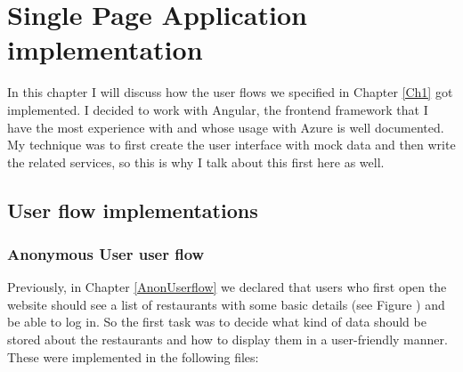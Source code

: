 \chapter{Single Page Application implementation}\label{Ch3}
 
 In this chapter I will discuss how the user flows we specified in Chapter \ref{Ch1} got implemented. I decided to work with Angular, the frontend framework that I have the most experience with and whose usage with Azure is well documented. My technique was to first create the user interface with mock data and then write the related services, so this is why I talk about this first here as well. 
 
\section{User flow implementations}
 
\subsection{Anonymous User user flow}

Previously, in Chapter \ref{AnonUserflow} we declared that users who first open the website should see a list of restaurants with some basic details (see Figure ) and be able to log in. So the first task was to decide what kind of data should be stored about the restaurants and how to display them in a user-friendly manner. These were implemented in the following files:

